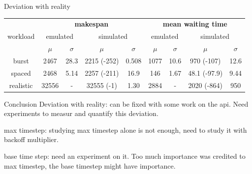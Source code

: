 \documentclass[12pt, aspectratio=43]{beamer}
\begin{document}
\begin{frame}{Deviation with reality}
	\centering
	\begin{adjustbox}{max width=\textwidth}
		\begin{tabular}{|c|c|c|c|c|c|c|c|c|}
			\hline

			\multirow{3}{*}{workload} & \multicolumn{4}{c|}{\textbf{makespan}} & \multicolumn{4}{c|}{\textbf{mean waiting time}}\\

			\cline{2-9}

			& \multicolumn{2}{c|}{emulated} &
			\multicolumn{2}{c|}{simulated} & \multicolumn{2}{c|}{emulated}
			& \multicolumn{2}{c|}{simulated} \\

			\cline{2-9}

			& $\mu$ & $\sigma$ & $\mu$ & $\sigma$ & $\mu$ & $\sigma$ & $\mu$ & $\sigma$ \\

			\hline

			burst & 2467 & 28.3 & 2215 (-252) & 0.508 & 1077 & 10.6 & 970 (-107) & 12.6 \\
			spaced & 2468 & 5.14 & 2257 (-211) & 16.9 & 146 & 1.67 & 48.1 (-97.9) & 9.44 \\
			realistic & 32556 & - & 32555 (-1) & 1.30 & 2884 & - & 2020 (-864) & 950 \\
			\hline
		\end{tabular}
	\end{adjustbox}
\end{frame}

\begin{frame}{Conclusion}
	Deviation with reality: can be fixed with some work on the api. Need
	experiments to measur and quantify this deviation.

	max timestep: studying max timestep alone is not enough, need to study
	it with backoff multiplier.

	base time step: need an experiment on it. Too much importance was
	credited to max timestep, the base timestep might have importance.
\end{frame}
\end{document}
